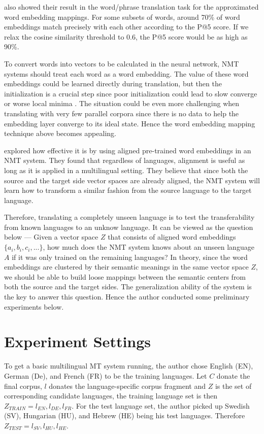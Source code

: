 \documentclass[thesis,fonts=libertine]{cluu}
\begin{document}
\cite{Mikolov:2013ac} also showed their result in the word/phrase translation task for the approximated word embedding mappings. For some subsets of words, around 70\% of word embeddings match precisely with each other according to the P@5 score. If we relax the cosine similarity threshold to 0.6, the P@5 score would be as high as 90\%.

To convert words into vectors to be calculated in the neural network, NMT systems should treat each word as a word embedding. The value of these word embeddings could be learned directly during translation, but then the initialization is a crucial step since poor initialization could lead to slow converge or worse local minima \parencite{glorot2010understanding}. The situation could be even more challenging when translating with very few parallel corpora since there is no data to help the embedding layer converge to its ideal state. Hence the word embedding mapping technique above becomes appealing.

\cite{Qi:2018aa} explored how effective it is by using aligned pre-trained word embeddings in an NMT system. They found that regardless of languages, alignment is useful as long as it is applied in a multilingual setting. They believe that since both the source and the target side vector spaces are already aligned, the NMT system will learn how to transform a similar fashion from the source language to the target language.

Therefore, translating a completely unseen language is to test the transferability from known languages to an unknow language. It can be viewed as the question below --- Given a vector space $Z$ that consists of aligned word embeddings $\{a_i, b_i, c_i, ...\}$, how much does the NMT system knows about an unseen language $A$ if it was only trained on the remaining languages? In theory, since the word embeddings are clustered by their semantic meanings in the same vector space $Z$, we should be able to build loose mappings between the semantic centers from both the source and the target sides. The generalization ability of the system is the key to answer this question. Hence the author conducted some preliminary experiments below.

\section{Experiment Settings}
\label{sec:initial_exp_settings}

To get a basic multilingual MT system running, the author chose English (EN), German (De), and French (FR) to be the training languages. Let $C$ donate the final corpus, $l$ donates the language-specific corpus fragment and $Z$ is the set of corresponding candidate languages, the training language set is then $Z_{TRAIN} = {l_{EN}, l_{DE}, l_{FR}}$. For the test language set, the author picked up Swedish (SV), Hungarian (HU), and Hebrew (HE) being his test languages. Therefore $Z_{TEST} = {l_{SV}, l_{HU}, l_{HE}}$.
\end{document}
